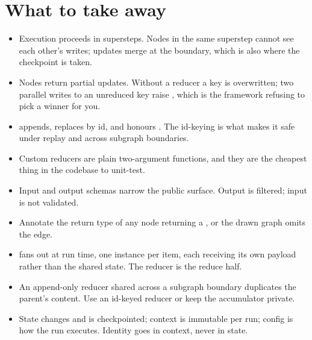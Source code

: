 \section{What to take away}
\label{sec:ch8-summary}

\begin{itemize}[leftmargin=1.4em]
\item Execution proceeds in supersteps. Nodes in the same superstep cannot see
      each other's writes; updates merge at the boundary, which is also where the
      checkpoint is taken.
\item Nodes return partial updates. Without a reducer a key is overwritten; two
      parallel writes to an unreduced key raise , which
      is the framework refusing to pick a winner for you.
\item {} appends, replaces by id, and honours
      . The id-keying is what makes it safe under replay and
      across subgraph boundaries.
\item Custom reducers are plain two-argument functions, and they are the cheapest
      thing in the codebase to unit-test.
\item Input and output schemas narrow the public surface. Output is filtered;
      input is not validated.
\item Annotate the return type of any node returning a , or the
      drawn graph omits the edge.
\item {} fans out at run time, one instance per item, each receiving its
      own payload rather than the shared state. The reducer is the reduce half.
\item An append-only reducer shared across a subgraph boundary duplicates the
      parent's content. Use an id-keyed reducer or keep the accumulator private.
\item State changes and is checkpointed; context is immutable per run; config is
      how the run executes. Identity goes in context, never in state.
\end{itemize}

